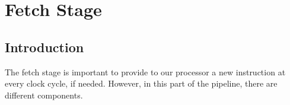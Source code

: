 \section{Fetch Stage}
\label{chap_ft}

\subsection{Introduction}
The fetch stage is important to provide to our processor a new instruction at every clock cycle, if needed.  However, in this part of the pipeline, there are different components.